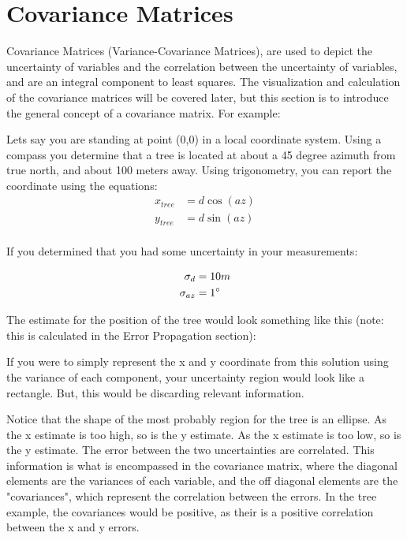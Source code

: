 \section{Covariance Matrices}
Covariance Matrices (Variance-Covariance Matrices), are used to depict the uncertainty of variables and the correlation between the uncertainty of variables, and are an integral component to least squares.  The visualization and calculation of the covariance matrices will be covered later, but this section is to introduce the general concept of a covariance matrix.  For example:

Lets say you are standing at point (0,0) in a local coordinate system.  Using a compass you determine that a tree is located at about a 45 degree azimuth from true north, and about 100 meters away.  Using trigonometry, you can report the coordinate using the equations:
\begin{align*}
x_{tree} &= d \cos(az) \\
y_{tree} &= d \sin(az) \\
\end{align*}


If you determined that you had some uncertainty in your measurements:

\begin{align*}
\sigma_d &= 10m \\
\sigma_{az} &= 1\degree \\
\end{align*}

The estimate for the position of the tree would look something like this (note: this is calculated in the Error Propagation section):


If you were to simply represent the x and y coordinate from this solution using the variance of each component, your uncertainty region would look like a rectangle.  But, this would be discarding relevant information.

Notice that the shape of the most probably region for the tree is an ellipse.  As the x estimate is too high, so is the y estimate.  As the x estimate is too low, so is the y estimate.  The error between the two uncertainties are correlated.  This information is what is encompassed in the covariance matrix, where the diagonal elements are the variances of each variable, and the off diagonal elements are the "covariances", which represent the correlation between the errors.  In the tree example, the covariances would be positive, as their is a positive correlation between the x and y errors.  

